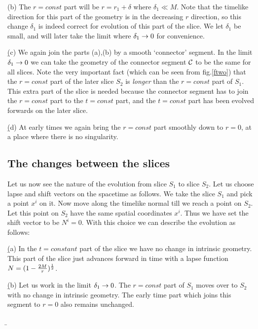 \documentclass[12pt]{article}
\begin{document}
(b) The $r=const$ part will be
$r=r_1+\delta$
where $\delta_1\ll M$. Note that the timelike direction for this part of the geometry is in the decreasing $r$ direction, so this change $\delta_1$ is indeed correct for evolution  of this part of the slice.  We let $\delta_1$ be small, and will later take the limit where $\delta_1\rightarrow 0$ for convenience. 

\b


(c) We again join the parts (a),(b) by  a smooth `connector' segment. In the limit $\delta_1\rightarrow 0$ we can take the geometry of the connector segment ${\cal C}$ to be the same for all slices. Note the very important fact (which can be seen from fig.\ref{ftwo}) that the $r=const$ part of the later slice ${S}_2$ is {\it longer} than the $r=const$ part of ${ S}_1$. This extra part of the slice is needed because the connector segment has to join the $r=const$ part to the $t=const$ part, and the $t=const$ part has been evolved forwards on the later slice.  

\b


(d) At early times we again bring the $r=const$ part smoothly down to $r=0$, at a place where there is no singularity. 

\subsection{The changes between the slices}\label{slicing}

Let us now see the nature of the evolution from slice ${ S}_1$ to slice ${S}_2$. Let us choose lapse and shift vectors on the spacetime as follows. We take the slice ${ S}_1$ and pick a point $x^i$ on it. Now move along the timelike normal till we reach a point on ${ S}_2$. Let  this point on ${ S}_2$ have the same spatial coordinates  $x^i$. Thus we have set the shift vector to be $N^i=0$. With this choice we can describe the evolution as follows:

\b

(a)  In the $t=constant$ part of the slice we have no change in intrinsic geometry. This part of the slice just advances forward in time with a lapse function $N=(1-{2M\over r})^{1\over 2}$.

\b


(b)  Let us work in the limit $\delta_1\rightarrow 0$. The $r=const$ part of ${ S}_1$ moves over to ${S}_2$ with no change in intrinsic geometry. The early time part which joins this segment to $r=0$ also remains unchanged. 

\b
\end{document}
